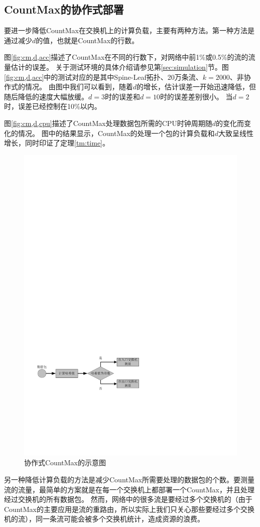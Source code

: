 \subsection{CountMax的协作式部署}\label{sec:coop}
要进一步降低CountMax在交换机上的计算负载，主要有两种方法。第一种方法是通过减少$d$的值，也就是CountMax的行数。

图\ref{fig:cm,d,acc}描述了CountMax在不同的行数下，对网络中前1\%或0.5\%的流的流量估计的误差。
关于测试环境的具体介绍请参见第\ref{sec:simulation}节。图\ref{fig:cm,d,acc}中的测试对应的是其中Spine-Leaf拓扑、20万条流、$k=2000$、非协作式的情况。
由图中我们可以看到，随着$d$的增长，估计误差一开始迅速降低，但随后降低的速度大幅放缓。$d=3$时的误差和$d=10$时的误差差别很小。
当$d=2$时，误差已经控制在10\%以内。

图\ref{fig:cm,d,cpu}描述了CountMax处理数据包所需的CPU时钟周期随$d$的变化而变化的情况。
图中的结果显示，CountMax的处理一个包的计算负载和$d$大致呈线性增长，同时印证了定理\ref{tm:time}。

\begin{figure}[h]
   \centering
   \includegraphics[width=0.7\linewidth]{fig/filter_measure.pdf}
   \caption{协作式CountMax的示意图}
   \label{fig:filtermeasurement}
\end{figure}

另一种降低计算负载的方法是减少CountMax所需要处理的数据包的个数。要测量流的流量，最简单的方案就是在每一个交换机上都部署一个CountMax，并且处理经过交换机的所有数据包。
然而，网络中的很多流是要经过多个交换机的（由于CountMax的主要应用是流的重路由，所以实际上我们只关心那些要经过多个交换机的流），同一条流可能会被多个交换机统计，造成资源的浪费。

